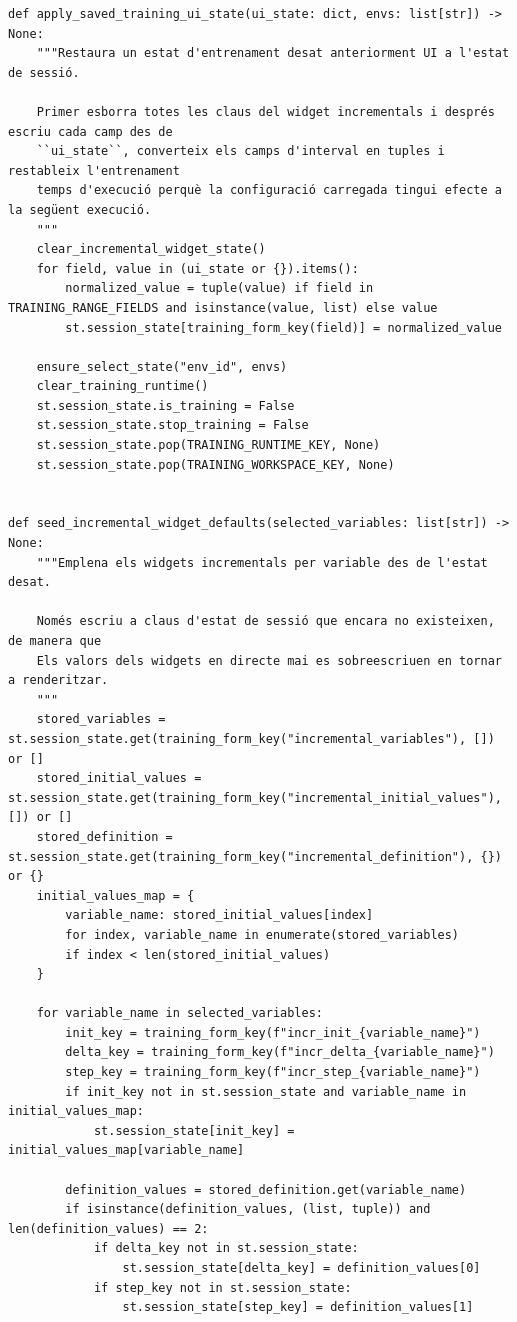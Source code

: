 \documentclass[10pt,a4paper]{article}
\begin{document}
\begin{lstlisting}[style=studioPython,caption={backend/entrenar\_agent\_session.py},label={lst:backend-entrenar-agent-session-py}]
def apply_saved_training_ui_state(ui_state: dict, envs: list[str]) -> None:
    """Restaura un estat d'entrenament desat anteriorment UI a l'estat de sessió.

    Primer esborra totes les claus del widget incrementals i després escriu cada camp des de
    ``ui_state``, converteix els camps d'interval en tuples i restableix l'entrenament
    temps d'execució perquè la configuració carregada tingui efecte a la següent execució.
    """
    clear_incremental_widget_state()
    for field, value in (ui_state or {}).items():
        normalized_value = tuple(value) if field in TRAINING_RANGE_FIELDS and isinstance(value, list) else value
        st.session_state[training_form_key(field)] = normalized_value

    ensure_select_state("env_id", envs)
    clear_training_runtime()
    st.session_state.is_training = False
    st.session_state.stop_training = False
    st.session_state.pop(TRAINING_RUNTIME_KEY, None)
    st.session_state.pop(TRAINING_WORKSPACE_KEY, None)


def seed_incremental_widget_defaults(selected_variables: list[str]) -> None:
    """Emplena els widgets incrementals per variable des de l'estat desat.

    Només escriu a claus d'estat de sessió que encara no existeixen, de manera que
    Els valors dels widgets en directe mai es sobreescriuen en tornar a renderitzar.
    """
    stored_variables = st.session_state.get(training_form_key("incremental_variables"), []) or []
    stored_initial_values = st.session_state.get(training_form_key("incremental_initial_values"), []) or []
    stored_definition = st.session_state.get(training_form_key("incremental_definition"), {}) or {}
    initial_values_map = {
        variable_name: stored_initial_values[index]
        for index, variable_name in enumerate(stored_variables)
        if index < len(stored_initial_values)
    }

    for variable_name in selected_variables:
        init_key = training_form_key(f"incr_init_{variable_name}")
        delta_key = training_form_key(f"incr_delta_{variable_name}")
        step_key = training_form_key(f"incr_step_{variable_name}")
        if init_key not in st.session_state and variable_name in initial_values_map:
            st.session_state[init_key] = initial_values_map[variable_name]

        definition_values = stored_definition.get(variable_name)
        if isinstance(definition_values, (list, tuple)) and len(definition_values) == 2:
            if delta_key not in st.session_state:
                st.session_state[delta_key] = definition_values[0]
            if step_key not in st.session_state:
                st.session_state[step_key] = definition_values[1]



\end{lstlisting}
\end{document}
